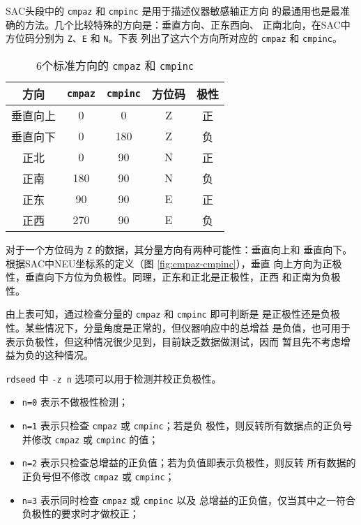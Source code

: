 SAC头段中的 \texttt{cmpaz} 和 \texttt{cmpinc} 是用于描述仪器敏感轴正方向
的最通用也是最准确的方法。几个比较特殊的方向是：垂直方向、正东西向、
正南北向，在SAC中方位码分别为 \texttt{Z}、\texttt{E} 和 \texttt{N}。下表
列出了这六个方向所对应的 \texttt{cmpaz} 和 \texttt{cmpinc}。
\begin{table}[H]
\caption{6个标准方向的 \texttt{cmpaz} 和 \texttt{cmpinc}}
\label{table:six-cmpaz-cmpinc}
\centering
\begin{tabular}{ccccc}
\toprule
方向     &   \texttt{cmpaz} & \texttt{cmpinc}  & 方位码 & 极性  \\
\midrule
垂直向上 &   0              &  0               & Z      & 正    \\
垂直向下 &   0              &  180             & Z      & 负    \\
正北     &   0              &  90              & N      & 正    \\
正南     &   180            &  90              & N      & 负    \\
正东     &   90             &  90              & E      & 正    \\
正西     &   270            &  90              & E      & 负    \\
\bottomrule
\end{tabular}
\end{table}

对于一个方位码为 \texttt{Z} 的数据，其分量方向有两种可能性：垂直向上和
垂直向下。根据SAC中NEU坐标系的定义（图 \ref{fig:cmpaz-cmpinc}），垂直
向上方向为正极性，垂直向下方位为负极性。同理，正东和正北是正极性，正西
和正南为负极性。

由上表可知，通过检查分量的 \texttt{cmpaz} 和 \texttt{cmpinc} 即可判断是
是正极性还是负极性。某些情况下，分量角度是正常的，但仪器响应中的总增益
是负值，也可用于表示负极性，但这种情况很少见到，目前缺乏数据做测试，因而
暂且先不考虑增益为负的这种情况。

\texttt{rdseed} 中 \texttt{-z n} 选项可以用于检测并校正负极性。
\begin{itemize}
\item \texttt{n=0} 表示不做极性检测；
\item \texttt{n=1} 表示只检查 \texttt{cmpaz} 或 \texttt{cmpinc}；若是负
    极性，则反转所有数据点的正负号并修改 \texttt{cmpaz} 或 \texttt{cmpinc}
    的值；
\item \texttt{n=2} 表示只检查总增益的正负值；若为负值即表示负极性，则反转
    所有数据的正负号但不修改 \texttt{cmpaz} 或 \texttt{cmpinc}；
\item \texttt{n=3} 表示同时检查 \texttt{cmpaz} 或 \texttt{cmpinc} 以及
    总增益的正负值，仅当其中之一符合负极性的要求时才做校正；
\end{itemize}

